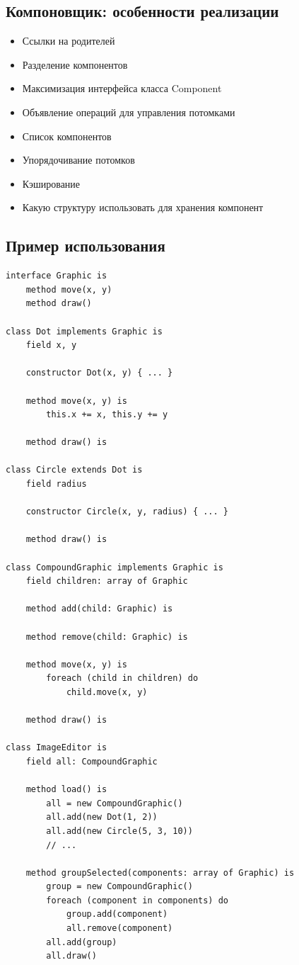 \subsection{Компоновщик: особенности реализации}
\begin{itemize}
    \item Ссылки на родителей
    \item Разделение компонентов
    \item Максимизация интерфейса класса Component
    \item Объявление операций для управления потомками
    \item Список компонентов
    \item Упорядочивание потомков
    \item Кэширование
    \item Какую структуру использовать для хранения компонент
    \end{itemize}

\subsection{Пример использования}
\begin{lstlisting}
interface Graphic is
    method move(x, y)
    method draw()

class Dot implements Graphic is
    field x, y

    constructor Dot(x, y) { ... }

    method move(x, y) is
        this.x += x, this.y += y

    method draw() is

class Circle extends Dot is
    field radius

    constructor Circle(x, y, radius) { ... }

    method draw() is

class CompoundGraphic implements Graphic is
    field children: array of Graphic

    method add(child: Graphic) is

    method remove(child: Graphic) is

    method move(x, y) is
        foreach (child in children) do
            child.move(x, y)

    method draw() is

class ImageEditor is
    field all: CompoundGraphic

    method load() is
        all = new CompoundGraphic()
        all.add(new Dot(1, 2))
        all.add(new Circle(5, 3, 10))
        // ...

    method groupSelected(components: array of Graphic) is
        group = new CompoundGraphic()
        foreach (component in components) do
            group.add(component)
            all.remove(component)
        all.add(group)
        all.draw()
\end{lstlisting}


